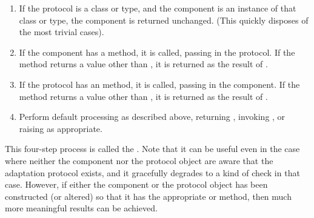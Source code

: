 \begin{enumerate}

\item If the protocol is a class or type, and the component is an instance
of that class or type, the component is returned unchanged.  (This quickly
disposes of the most trivial cases).

\item If the component has a  method, it is called,
passing in the protocol.  If the method returns a value other than
, it is returned as the result of .

\item If the protocol has an  method, it is called,
passing in the component.  If the method returns a value other than
, it is returned as the result of .

\item Perform default processing as described above, returning ,
invoking , or raising  as
appropriate.

\end{enumerate}

This four-step process is called the .  Note
that it can be useful even in the case where neither the component nor the
protocol object are aware that the adaptation protocol exists, and it
gracefully degrades to a kind of  check in that
case.  However, if either the component or the protocol object has been
constructed (or altered) so that it has the appropriate 
or  method, then much more meaningful results can be
achieved.


